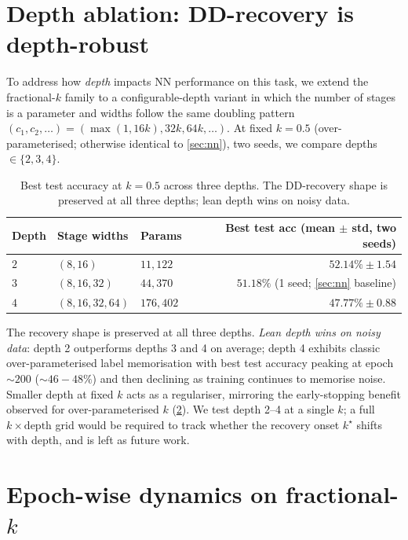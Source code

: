 \section{Depth ablation: DD-recovery is depth-robust}
\label{app:ablations}

To address how \emph{depth} impacts NN performance on this task, we extend the fractional-$k$ family to a configurable-depth variant in which the number of stages is a parameter and widths follow the same doubling pattern $(c_1,c_2,\ldots) = (\max(1, 16k), 32k, 64k,\ldots)$. At fixed $k\!=\!0.5$ (over-parameterised; otherwise identical to \cref{sec:nn}), two seeds, we compare depths $\in\{2, 3, 4\}$.

\begin{table}[t]
  \centering
  \small
  \caption{Best test accuracy at $k\!=\!0.5$ across three depths. The DD-recovery shape is preserved at all three depths; lean depth wins on noisy data.}
  \label{tab:depth-ablation}
  \begin{tabular}{@{}lllr@{}}
    \toprule
    Depth & Stage widths & Params & Best test acc (mean $\pm$ std, two seeds) \\
    \midrule
    $2$ & $(8, 16)$ & $11{,}122$ & $\mathbf{52.14\% \pm 1.54}$ \\
    $3$ & $(8, 16, 32)$ & $44{,}370$ & $51.18\%$ (1 seed; \cref{sec:nn} baseline) \\
    $4$ & $(8, 16, 32, 64)$ & $176{,}402$ & $47.77\% \pm 0.88$ \\
    \bottomrule
  \end{tabular}
\end{table}

The recovery shape is preserved at all three depths. \emph{Lean depth wins on noisy data}: depth 2 outperforms depths 3 and 4 on average; depth 4 exhibits classic over-parameterised label memorisation with best test accuracy peaking at epoch $\sim 200$ ($\sim 46\!-\!48\%$) and then declining as training continues to memorise noise. Smaller depth at fixed $k$ acts as a regulariser, mirroring the early-stopping benefit observed for over-parameterised $k$ (\cref{app:epochwise}). We test depth 2--4 at a single $k$; a full $k\!\times\!\text{depth}$ grid would be required to track whether the recovery onset $k^\star$ shifts with depth, and is left as future work.

\section{Epoch-wise dynamics on fractional-$k$}
\label{app:epochwise}

